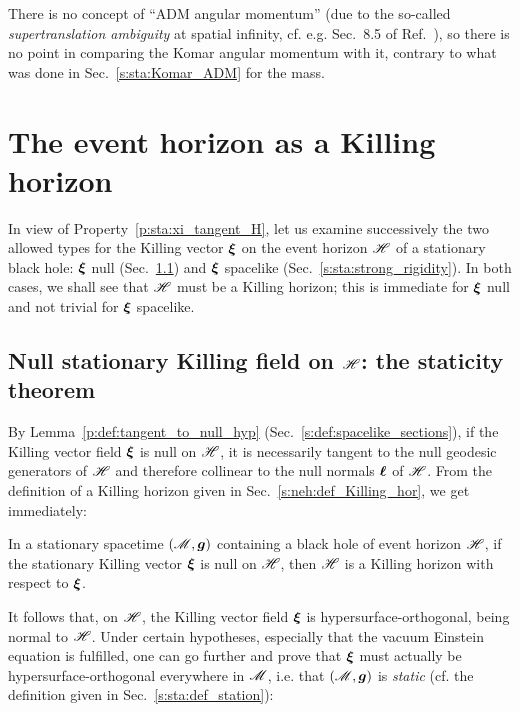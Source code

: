 \begin{remark}
There is no concept of ``ADM angular momentum'' (due to the so-called
\emph{supertranslation ambiguity} at spatial infinity, cf. e.g. Sec.~8.5
of Ref.~\cite{Gourg12}), so there is no point in comparing the Komar angular momentum
with it, contrary to what was done in Sec.~\ref{s:sta:Komar_ADM} for the mass.
\end{remark}



\section{The event horizon as a Killing horizon} \label{s:sta:EH_KH}

In view of Property~\ref{p:sta:xi_tangent_H}, let us
examine successively the two allowed types for the
Killing vector $\bm{\xi}$ on the event horizon $\mathscr{H}$ of a stationary black hole:
$\bm{\xi}$ null (Sec.~\ref{s:sta:staticity_thm})
and $\bm{\xi}$ spacelike (Sec.~\ref{s:sta:strong_rigidity}). In both cases, we shall see
that $\mathscr{H}$ must be a Killing horizon; this is immediate
for $\bm{\xi}$ null and not trivial for $\bm{\xi}$ spacelike.

\subsection{Null stationary Killing field on $\mathscr{H}$: the staticity theorem}\label{s:sta:staticity_thm}

By Lemma~\ref{p:def:tangent_to_null_hyp} (Sec.~\ref{s:def:spacelike_sections}),
if the Killing vector
field $\bm{\xi}$ is null on $\mathscr{H}$, it is necessarily tangent to the null geodesic generators
of $\mathscr{H}$ and therefore collinear to the null normals $\bm{\ell}$ of $\mathscr{H}$. From the definition
of a Killing horizon
given in Sec.~\ref{s:neh:def_Killing_hor}, we get immediately:

\begin{prop}
\label{p:sta:H_Killing_hor_xi_null}
In a stationary spacetime $(\mathscr{M},\bm{g})$ containing a black hole
of event horizon $\mathscr{H}$, if the stationary Killing vector $\bm{\xi}$
is null on $\mathscr{H}$, then $\mathscr{H}$ is a Killing horizon with respect to $\bm{\xi}$.
\end{prop}

It follows that, on $\mathscr{H}$, the Killing vector field $\bm{\xi}$
is hypersurface-orthogonal, being normal to $\mathscr{H}$. Under certain hypotheses, especially
that the vacuum Einstein equation is fulfilled, one can go further
and prove that $\bm{\xi}$ must actually be hypersurface-orthogonal everywhere in $\mathscr{M}$,
i.e. that $(\mathscr{M},\bm{g})$ is \emph{static} (cf. the definition given in Sec.~\ref{s:sta:def_station}):

